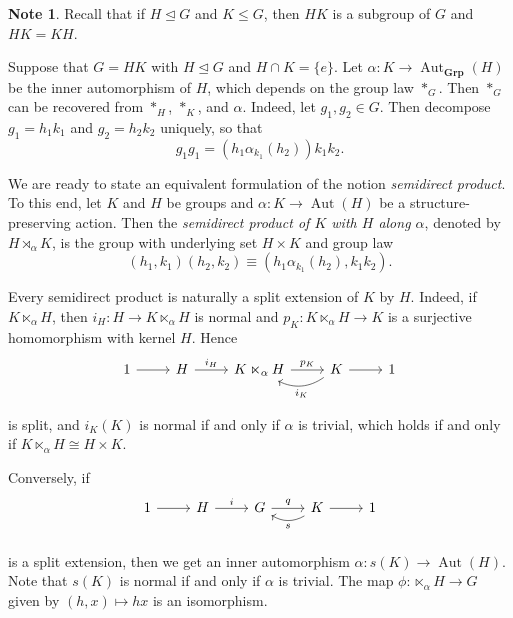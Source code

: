 \documentclass[10pt,letterpaper,cm]{nupset}
\theoremstyle{definition}
\newtheorem{note}[definition]{Note}
\theoremstyle{theorem}
\theoremstyle{remark}
\newcommand{\1}{\mathbf{1}}
\newcommand{\0}{\vec 0}
\DeclareMathOperator{\aut}{Aut}
\begin{document}
\begin{note}
Recall that if $H \unlhd G$ and $K \leq G$, then $HK$ is a subgroup of $G$ and $HK= KH$.
\end{note}

\medskip

Suppose that $G = HK$ with $H\unlhd G$ and $H \cap K = \{e\}$. Let $\alpha : K \to \aut_{\mathbf{Grp}}(H)$ be the inner automorphism of $H$, which depends on the group law $*_G$. Then $*_G$ can be recovered from $*_H$, $*_K$, and $\alpha$.
Indeed,
let $g_1, g_2 \in G$. Then decompose $g_1 = h_1k_1$ and $g_2= h_2k_2$ uniquely, so that $$g_1g_1 = (h_1\alpha_{k_1}(h_2))k_1k_2.$$

\medskip

We are ready to state an equivalent formulation of the notion \textit{semidirect product}. To this end,
let $K$ and $H$ be groups and $\alpha : K \to \aut(H)$ be a structure-preserving action. Then the \textit{semidirect product of $K$ with $H$ along $\alpha$}, denoted by $H \rtimes_{\alpha} K$, is the group with underlying set $H \times K$ and group law $$\left(h_1, k_1\right)\left(h_2, k_2\right) \equiv  \left(h_1 \alpha_{k_1}(h_2), k_1k_2\right).$$

Every semidirect product is naturally a split extension of $K$ by $H$. Indeed, if $K \ltimes_{\alpha} H$, then $i_H : H \to K \ltimes_{\alpha} H$ is normal and $p_K : K\ltimes_{\alpha} H \to K$ is a surjective homomorphism with kernel $H$. Hence \[
	\begin{tikzcd}
	1\rar &H\rar["i_H" above] & K\ltimes_{\alpha} H \rar["p_K" above] & K\rar\lar[bend left=30,"i_K" below] & 1 \\
	\end{tikzcd}
\] is split, and $i_K(K)$ is normal  if and only if $\alpha$ is trivial, which holds if and only if $K \ltimes_{\alpha} H \cong H \times K$.

\smallskip

 Conversely, if 
\[
	\begin{tikzcd}
	1\rar &H\rar["i" above] & G \rar["q" above] & K\rar\lar[bend left=30,"s" below] & 1 \\
	\end{tikzcd}
\]
is a split extension, then we get an inner automorphism $\alpha : s(K) \to \aut(H)$. Note that $s(K)$ is normal if and only if $\alpha$ is trivial. The map $\phi : \ltimes_{\alpha} H \to G$ given by $(h,x) \mapsto hx$ is an isomorphism.
\end{document}
